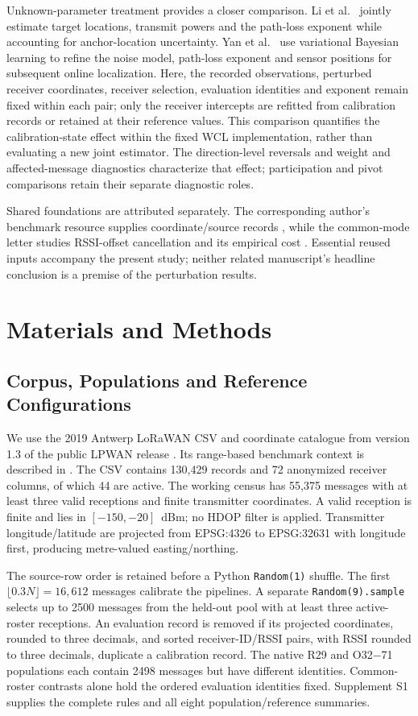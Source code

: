 \documentclass[11pt,a4paper]{article}
\begin{document}
Unknown-parameter treatment provides a closer comparison. Li et al.~\cite{ref10} jointly estimate target locations, transmit powers and the path-loss exponent while accounting for anchor-location uncertainty. Yan et al.~\cite{ref11} use variational Bayesian learning to refine the noise model, path-loss exponent and sensor positions for subsequent online localization. Here, the recorded observations, perturbed receiver coordinates, receiver selection, evaluation identities and exponent remain fixed within each pair; only the receiver intercepts are refitted from calibration records or retained at their reference values. This comparison quantifies the calibration-state effect within the fixed WCL implementation, rather than evaluating a new joint estimator. The direction-level reversals and weight and affected-message diagnostics characterize that effect; participation and pivot comparisons retain their separate diagnostic roles.

Shared foundations are attributed separately. The corresponding author's benchmark resource supplies coordinate/source records \cite{ref15}, while the common-mode letter studies RSSI-offset cancellation and its empirical cost \cite{ref23}. Essential reused inputs accompany the present study; neither related manuscript's headline conclusion is a premise of the perturbation results.

\section{Materials and Methods}\label{sec:methods}
\subsection{Corpus, Populations and Reference Configurations}\label{sec:maps}
We use the 2019 Antwerp LoRaWAN CSV and coordinate catalogue from version 1.3 of the public LPWAN release \cite{ref19,ref20}. Its range-based benchmark context is described in \cite{ref21}. The CSV contains 130,429 records and 72 anonymized receiver columns, of which 44 are active. The working census has 55,375 messages with at least three valid receptions and finite transmitter coordinates. A valid reception is finite and lies in $[-150,-20]$~dBm; no HDOP filter is applied. Transmitter longitude/latitude are projected from EPSG:4326 to EPSG:32631 with longitude first, producing metre-valued easting/northing.

The source-row order is retained before a Python \texttt{Random(1)} shuffle. The first $\lfloor0.3N\rfloor=16,612$ messages calibrate the pipelines. A separate \texttt{Random(9).sample} selects up to 2500 messages from the held-out pool with at least three active-roster receptions. An evaluation record is removed if its projected coordinates, rounded to three decimals, and sorted receiver-ID/RSSI pairs, with RSSI rounded to three decimals, duplicate a calibration record. The native R29 and O32$-$71 populations each contain 2498 messages but have different identities. Common-roster contrasts alone hold the ordered evaluation identities fixed. Supplement S1 supplies the complete rules and all eight population/reference summaries.
\end{document}
